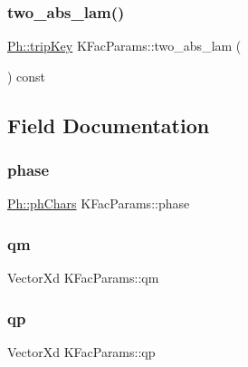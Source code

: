 \subsubsection{\texorpdfstring{two\_abs\_lam()}{two\_abs\_lam()}}
{\footnotesize\ttfamily \mbox{\hyperlink{namespacePh_afdd5bf3d7b37625115089ea3048e0cbb}{Ph\+::trip\+Key}} K\+Fac\+Params\+::two\+\_\+abs\+\_\+lam (\begin{DoxyParamCaption}{ }\end{DoxyParamCaption}) const\hspace{0.3cm}{\ttfamily [virtual]}}



\subsection{Field Documentation}
\mbox{\label{classKFacParams_a11bbd8e5410736d62531d89522f73a83}} 
\subsubsection{\texorpdfstring{phase}{phase}}
{\footnotesize\ttfamily \mbox{\hyperlink{structPh_1_1phChars}{Ph\+::ph\+Chars}} K\+Fac\+Params\+::phase}

\mbox{\label{classKFacParams_a1554adf6e901c25d34d29e84f91090a9}} 
\subsubsection{\texorpdfstring{qm}{qm}}
{\footnotesize\ttfamily Vector\+Xd K\+Fac\+Params\+::qm}

\mbox{\label{classKFacParams_ad9669d8cc162e568d6c274d5b69bec71}} 
\subsubsection{\texorpdfstring{qp}{qp}}
{\footnotesize\ttfamily Vector\+Xd K\+Fac\+Params\+::qp}

\mbox{\label{classKFacParams_a8948965a0d38a1ae8b6a44b9833080ef}} 
